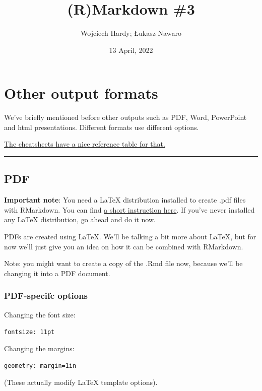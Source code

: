 \documentclass[
  11pt,
]{article}
\title{(R)Markdown \#3}
\author{Wojciech Hardy; Łukasz Nawaro}
\date{13 April, 2022}
\begin{document}
\maketitle

{
\setcounter{tocdepth}{3}
\tableofcontents
}
\hypertarget{other-output-formats}{%
\section{Other output formats}\label{other-output-formats}}

We've briefly mentioned before other outputs such as PDF, Word,
PowerPoint and html presentations. Different formats use different
options.

\href{https://www.rstudio.com/wp-content/uploads/2015/03/rmarkdown-reference.pdf}{The
cheatsheets have a nice reference table for that.}

\begin{center}\rule{0.5\linewidth}{0.5pt}\end{center}

\hypertarget{pdf}{%
\subsection{PDF}\label{pdf}}

\textbf{Important note}: You need a LaTeX distribution installed to
create .pdf files with RMarkdown. You can find
\href{https://bookdown.org/yihui/rmarkdown-cookbook/install-latex.html}{a
short instruction here}. If you've never installed any LaTeX
distribution, go ahead and do it now.

PDFs are created using LaTeX. We'll be talking a bit more about LaTeX,
but for now we'll just give you an idea on how it can be combined with
RMarkdown.

Note: you might want to create a copy of the .Rmd file now, because
we'll be changing it into a PDF document.

\hypertarget{pdf-specifc-options}{%
\subsubsection{PDF-specifc options}\label{pdf-specifc-options}}

Changing the font size:

\texttt{fontsize:\ 11pt}

Changing the margins:

\texttt{geometry:\ margin=1in}

(These actually modify LaTeX template options).
\end{document}
